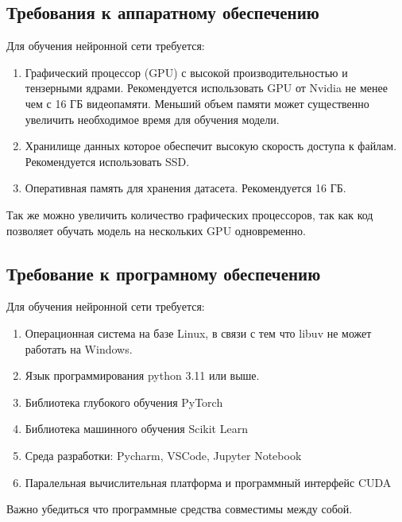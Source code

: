 \documentclass[../part_2.tex]{subfiles}
\begin{document}
\subsection{Требования к аппаратному обеспечению}
\par Для обучения нейронной сети требуется:
\begin{enumerate}
    \item Графический процессор (GPU) с высокой производительностью и тензерными ядрами. Рекомендуется использовать GPU от Nvidia не менее чем с 16 ГБ видеопамяти. Меньший объем памяти может существенно увеличить необходимое время для обучения модели.
    \item Хранилище данных которое обеспечит высокую скорость доступа к файлам. Рекомендуется использовать SSD.
    \item Оперативная память для хранения датасета. Рекомендуется 16 ГБ.
\end{enumerate}
\par Так же можно увеличить количество графических процессоров, так как код позволяет обучать модель на нескольких GPU одновременно.
\subsection{Требование к програмному обеспечению}
\par Для обучения нейронной сети требуется:
\begin{enumerate}
    \item Операционная система на базе Linux, в связи с тем что libuv не может работать на Windows.
    \item Язык программирования python 3.11 или выше.
    \item Библиотека глубокого обучения PyTorch
    \item Библиотека машинного обучения Scikit Learn
    \item Среда разработки: Pycharm, VSCode, Jupyter Notebook
    \item Паралельная вычислительная платформа и программный интерфейс CUDA
\end{enumerate}
\par Важно убедиться что программные средства совместимы между собой.
\end{document}
